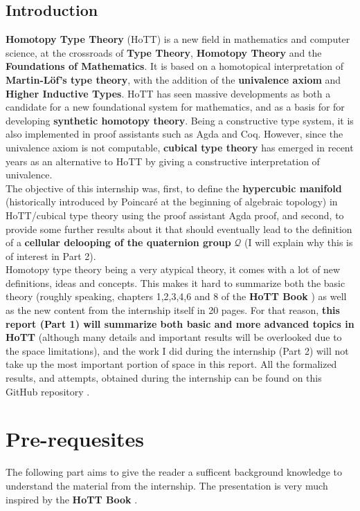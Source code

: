 \documentclass{report}
\begin{document}
\section{Introduction}
\textbf{Homotopy Type Theory} (HoTT) is a new field in mathematics and computer science, at the crossroads of \textbf{Type Theory}, \textbf{Homotopy Theory} and the \textbf{Foundations of Mathematics}. It is based on a homotopical interpretation of \textbf{Martin-Löf's type theory}, with the addition of the \textbf{univalence axiom} and \textbf{Higher Inductive Types}. HoTT has seen massive developments as both a candidate for a new foundational system for mathematics, and as a basis for for developing \textbf{synthetic homotopy theory}. Being a constructive type system, it is also implemented in proof assistants such as Agda and Coq. However, since the univalence axiom is not computable,  \textbf{cubical type theory} has emerged in recent years as an alternative to HoTT by giving a constructive interpretation of univalence.\\
The objective of this internship was, first, to define the \textbf{hypercubic manifold} \cite{hypercubic} (historically introduced by Poincaré at the beginning of algebraic topology) in HoTT/cubical type theory using the proof assistant Agda proof, and second, to provide some further results about it that should eventually lead to the definition of a \textbf{cellular delooping of the quaternion group} $\mathcal Q$ (I will explain why this is of interest in Part 2).\\
Homotopy type theory being a very atypical theory, it comes with a lot of new definitions, ideas and concepts. This makes it hard to summarize both the basic theory (roughly speaking, chapters 1,2,3,4,6 and 8 of the \textbf{HoTT Book} \cite{hott}) as well as the new content from the internship itself in 20 pages. For that reason, \textbf{this report (Part 1) will summarize both basic and more advanced topics in HoTT} (although many details and important results will be overlooked due to the space limitations), and the work I did during the internship (Part 2) will not take up the most important portion of space in this report. All the formalized results, and attempts, obtained during the internship can be found on this GitHub repository \cite{repo}.
\chapter{Pre-requesites}
The following part aims to give the reader a sufficent background knowledge  to understand the material from the internship. The presentation is very much inspired by the \textbf{HoTT Book} \cite{hott}. 
\end{document}
